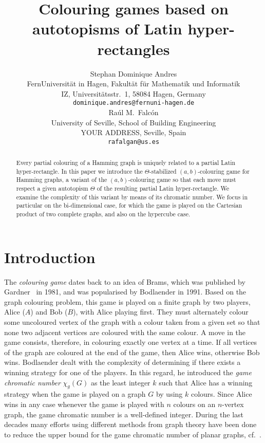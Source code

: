 \documentclass{article}
\title{Colouring games based on autotopisms of Latin hyper-rectangles}
\author{Stephan Dominique Andres\\
{\small FernUniversit\"{a}t in Hagen, Fakult\"{a}t f\"{u}r Mathematik und Informatik}\\
{\small IZ, Universit\"{a}tsstr.\ 1, 58084 Hagen, Germany}\\
{\small \texttt{dominique.andres@fernuni-hagen.de}}\\
Ra\'ul M.\ Falc\'on\\
{\small  University of Seville, School of Building Engineering}\\
{\small  YOUR ADDRESS, Seville, Spain}\\
{\small  \texttt{rafalgan@us.es}}\\}
\begin{document}
\maketitle


\begin{abstract}
Every partial colouring of a Hamming graph is uniquely related to a partial Latin hyper-rectangle. In this paper we introduce the $\Theta$-stabilized $(a,b)$-colouring game for Hamming graphs, a variant of the $(a,b)$-colouring game so that each move must respect a given autotopism $\Theta$ of the resulting partial Latin hyper-rectangle. We examine the complexity of this variant by means of its chromatic number. We focus in particular on the bi-dimensional case, for which the game is played on the Cartesian product of two complete graphs, and also on the hypercube case.
\end{abstract}

\section{Introduction}

The {\em colouring game} dates back to an idea of Brams, which was published by Gardner~\cite{gardner} in 1981, and was popularised by Bodlaender \cite{Bodlaender1991} in 1991. Based on the graph colouring problem, this 
game is played on a finite graph by two players, Alice ($A$) and Bob ($B$), with Alice 
playing first. They must alternately colour some uncoloured vertex of the graph with a colour taken from a given set so  that none two adjacent vertices are coloured with the same colour. A move in the game consists, 
therefore, in colouring exactly one vertex at a time. If all vertices of the graph are coloured at the end of the game,  then Alice wins, otherwise Bob wins. Bodlaender dealt with the complexity of determining if there 
exists a winning strategy for one of the players. In this regard, he introduced the {\em game chromatic number} $\chi_g(G)$ as the least integer $k$ such that Alice has 
a winning strategy when the game is played on a graph $G$ by using $k$ colours. 
Since Alice wins in any case whenever the game is played with $n$ colours on an $n$-vertex graph, the game chromatic number is a well-defined integer.
During the last decades many efforts using different methods from graph theory have been done to reduce the upper bound for the 
game chromatic number of planar graphs, cf.\ \cite{bartnickietal,kierstead,zhurefined}.
\end{document}
